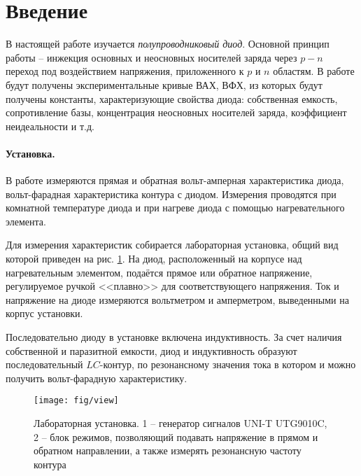 \documentclass[a4paper,14pt]{extarticle}
\begin{document}


\tableofcontents
\newpage



\section*{Введение}
\vspace{-0.5em}
В настоящей работе изучается \textit{полупроводниковый диод}. Основной принцип работы -- инжекция основных и неосновных носителей заряда через $p-n$ переход под воздействием напряжения, приложенного к $p$ и $n$ областям. В работе будут получены экспериментальные кривые ВАХ, ВФХ, из которых будут получены константы, характеризующие свойства диода: собственная емкость, сопротивление базы, концентрация неосновных носителей заряда, коэффициент неидеальности и т.д.



\vspace{-0.5em}


\paragraph{Установка.} В работе измеряются прямая и обратная вольт-амперная характеристика диода, вольт-фарадная характеристика контура с диодом. Измерения проводятся при комнатной температуре диода и при нагреве диода с помощью нагревательного элемента. 

Для измерения характеристик собирается лабораторная установка, общий вид которой приведен на рис. \ref{fig:1}. На диод, расположенный на корпусе над нагревательным элементом, подаётся прямое или обратное напряжение, регулируемое ручкой <<плавно>> для соответствующего напряжения. Ток и напряжение на диоде измеряются вольтметром и амперметром, выведенными на корпус установки. 

Последовательно диоду в установке включена индуктивность. За счет наличия собственной и паразитной емкости, диод и индуктивность образуют последовательный $LC$-контур, по резонансному значения тока в котором и можно получить вольт-фарадную характеристику.

\begin{figure}[H]
	\centering
	\texttt{[image: fig/view]}
	\vspace{-1em}
	\caption{Лабораторная установка. 1 -- генератор сигналов UNI-T UTG9010C, 2 -- блок режимов, позволяющий подавать напряжение в прямом и обратном направлении, а также измерять резонансную частоту контура}
	\label{fig:1}
\end{figure}
\end{document}
